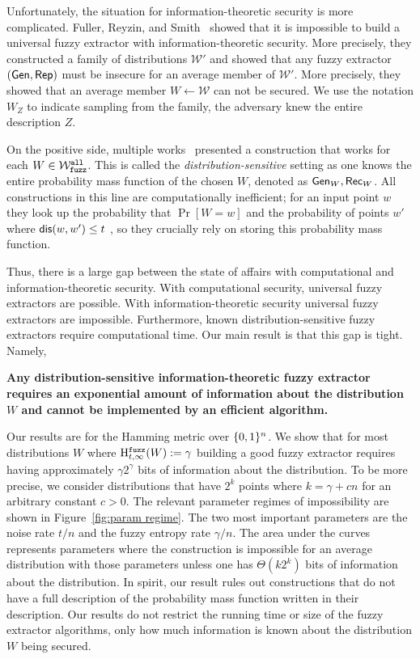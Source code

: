 Unfortunately, the situation for information-theoretic security is more complicated.  Fuller, Reyzin, and Smith~\cite{fuller2020fuzzy} showed that it is impossible to build a universal fuzzy extractor with information-theoretic security.  More precisely, they constructed a family of distributions $\mathcal{W}'$ and showed that any fuzzy extractor $({\mathsf{Gen}}, {\mathsf{Rep}})$ must be insecure for an average member of $\mathcal{W}'$.  More precisely, they showed that an average member $W\leftarrow \mathcal{W}$ can not be secured. We use the notation $W_Z$ to indicate sampling from the family, the adversary knew the entire description $Z$.

On the positive side, multiple works~\cite{hayashi2014secret,hayashi2016secret,fuller2016fuzzy,woodage2017new,tyagi2017universal,TVW18,LA18,fuller2019continuous,fuller2020fuzzy} presented a construction that works for each $W\in \mathcal{W}_{\mathtt{fuzz}}^{\mathtt{all}}$.  This is called the \emph{distribution-sensitive} setting as one knows the entire probability mass function of the chosen $W$, denoted as ${\mathsf{Gen}}_W, {\mathsf{Rec}}_W$.  All constructions in this line are computationally inefficient; for an input point $w$ they look up the probability that $\Pr[W=w]$ and the probability of points $w'$ where $\mathsf{dis}(w, w')\le t$ , so they crucially rely on storing this probability mass function.  

Thus, there is a large gap between the state of affairs with computational and information-theoretic security.  With computational security, universal fuzzy extractors are possible.  With information-theoretic security universal fuzzy extractors are impossible.  Furthermore, known distribution-sensitive fuzzy extractors require computational time.  Our main result is that this gap is tight.  Namely,

\begin{displayquote}
\textbf{Any distribution-sensitive information-theoretic fuzzy extractor requires an exponential amount of information about the distribution $W$ and cannot be implemented by an efficient algorithm.} 
\end{displayquote} 
Our results are for the Hamming metric over $\{0, 1\}^n$. We show that for most distributions $W$ where $\mathrm{H}^{\mathtt{fuzz}}_{t,\infty}(W) := \gamma$ building a good fuzzy extractor requires having approximately $\gamma 2^\gamma$ bits of information about the distribution. To be more precise,  we consider distributions that have $2^k$ points where $k = \gamma + c n$ for an arbitrary constant $c>0$. 
The relevant parameter regimes of impossibility are shown in Figure~\ref{fig:param regime}.  The two most important parameters are the noise rate $t/n$ and the fuzzy entropy rate $\gamma/n$. The area under the curves represents parameters where the construction is impossible for an average distribution with those parameters unless one has $\Theta(k 2^k)$ bits of information about the distribution.  
In spirit, our result rules out constructions that do not have a full description of the probability mass function written in their description.  Our results do not restrict the running time or size of the fuzzy extractor algorithms, only how much information is known about the distribution $W$ being secured.  





